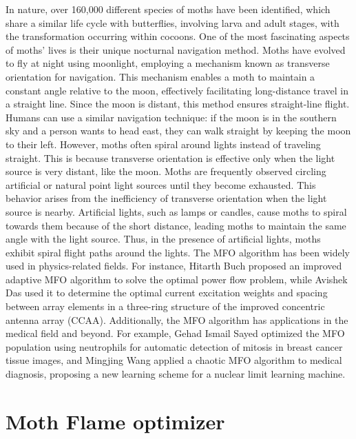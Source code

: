 \documentclass[conference]{IEEEtran}
\begin{document}
In nature, over 160,000 different species of moths have been identified, which share a similar life cycle with butterflies, involving larva and adult stages, with the transformation occurring within cocoons. One of the most fascinating aspects of moths’ lives is their unique nocturnal navigation method. Moths have evolved to fly at night using moonlight, employing a mechanism known as transverse orientation for navigation. This mechanism enables a moth to maintain a constant angle relative to the moon, effectively facilitating long-distance travel in a straight line. Since the moon is distant, this method ensures straight-line flight. Humans can use a similar navigation technique: if the moon is in the southern sky and a person wants to head east, they can walk straight by keeping the moon to their left. However, moths often spiral around lights instead of traveling straight. This is because transverse orientation is effective only when the light source is very distant, like the moon. Moths are frequently observed circling artificial or natural point light sources until they become exhausted. This behavior arises from the inefficiency of transverse orientation when the light source is nearby. Artificial lights, such as lamps or candles, cause moths to spiral towards them because of the short distance, leading moths to maintain the same angle with the light source. Thus, in the presence of artificial lights, moths exhibit spiral flight paths around the lights.
The MFO algorithm has been widely used in physics-related fields. For instance, Hitarth Buch proposed an improved adaptive MFO algorithm to solve the optimal power flow problem, while Avishek Das used it to determine the optimal current excitation weights and spacing between array elements in a three-ring structure of the improved concentric antenna array (CCAA). Additionally, the MFO algorithm has applications in the medical field and beyond. For example, Gehad Ismail Sayed optimized the MFO population using neutrophils for automatic detection of mitosis in breast cancer tissue images, and Mingjing Wang applied a chaotic MFO algorithm to medical diagnosis, proposing a new learning scheme for a nuclear limit learning machine.

\section{Moth Flame optimizer}
\end{document}
